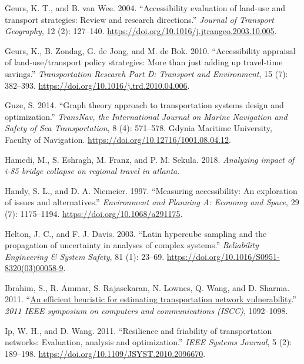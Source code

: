\documentclass[]{ascelike-new}
\newlength{\cslhangindent}
\newlength{\cslentryspacingunit} %
\newenvironment{CSLReferences}[2] %
 {%
  \setlength{\parindent}{0pt}
  \ifodd #1
  \let\oldpar\par
  \def\par{\hangindent=\cslhangindent\oldpar}
  \fi
  \setlength{\parskip}{#2\cslentryspacingunit}
 }%
 {}
\begin{document}
\begin{CSLReferences}{1}{0}
\leavevmode{}%
Geurs, K. T., and B. van Wee. 2004. {``Accessibility evaluation of
land-use and transport strategies: Review and research directions.''}
\emph{Journal of Transport Geography}, 12 (2): 127--140.
\url{https://doi.org/10.1016/j.jtrangeo.2003.10.005}.

\leavevmode{}%
Geurs, K., B. Zondag, G. de Jong, and M. de Bok. 2010. {``Accessibility
appraisal of land-use/transport policy strategies: More than just adding
up travel-time savings.''} \emph{Transportation Research Part D:
Transport and Environment}, 15 (7): 382--393.
\url{https://doi.org/10.1016/j.trd.2010.04.006}.

\leavevmode{}%
Guze, S. 2014. {``Graph theory approach to transportation systems design
and optimization.''} \emph{TransNav, the International Journal on Marine
Navigation and Safety of Sea Transportation}, 8 (4): 571--578. Gdynia
Maritime University, Faculty of Navigation.
\url{https://doi.org/10.12716/1001.08.04.12}.

\leavevmode{}%
Hamedi, M., S. Eshragh, M. Franz, and P. M. Sekula. 2018.
\emph{Analyzing impact of i-85 bridge collapse on regional travel in
atlanta}.

\leavevmode{}%
Handy, S. L., and D. A. Niemeier. 1997. {``Measuring accessibility: An
exploration of issues and alternatives.''} \emph{Environment and
Planning A: Economy and Space}, 29 (7): 1175--1194.
\url{https://doi.org/10.1068/a291175}.

\leavevmode{}%
Helton, J. C., and F. J. Davis. 2003. {``Latin hypercube sampling and
the propagation of uncertainty in analyses of complex systems.''}
\emph{Reliability Engineering \& System Safety}, 81 (1): 23--69.
\url{https://doi.org/10.1016/S0951-8320(03)00058-9}.

\leavevmode{}%
Ibrahim, S., R. Ammar, S. Rajasekaran, N. Lownes, Q. Wang, and D.
Sharma. 2011. {``\href{https://doi.org/10.1109/ISCC.2011.5983988}{An
efficient heuristic for estimating transportation network
vulnerability}.''} \emph{2011 IEEE symposium on computers and
communications (ISCC)}, 1092--1098.

\leavevmode{}%
Ip, W. H., and D. Wang. 2011. {``Resilience and friability of
transportation networks: Evaluation, analysis and optimization.''}
\emph{IEEE Systems Journal}, 5 (2): 189--198.
\url{https://doi.org/10.1109/JSYST.2010.2096670}.


\end{CSLReferences}
\end{document}
